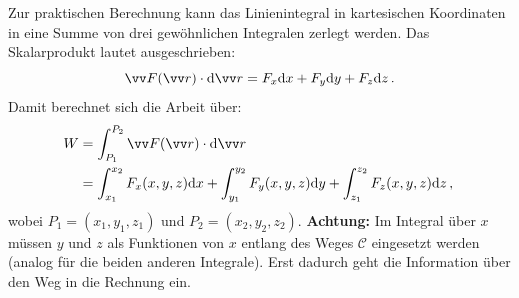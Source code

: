 Zur praktischen Berechnung kann das Linienintegral in kartesischen Koordinaten in eine Summe von drei gewöhnlichen Integralen zerlegt werden. Das Skalarprodukt lautet ausgeschrieben:
\begin{equation}
    \ivec{F}(\ivec{r}) \cdot \dd\ivec{r} = F_x \dd x + F_y \dd y + F_z \dd z \mDot
\end{equation}
Damit berechnet sich die Arbeit über:
\begin{equation}\label{eq: arbeit_integral_komponenten}\begin{aligned}
    W &= \int_{P_1}^{P_2} \ivec{F}(\ivec{r}) \cdot \dd \ivec{r} \\
    &= \int_{x_1}^{x_2} F_x(x,y,z) \dd x + \int_{y_1}^{y_2} F_y(x,y,z) \dd y + \int_{z_1}^{z_2} F_z(x,y,z) \dd z \mComma
\end{aligned}\end{equation}
wobei $P_1 = (x_1, y_1, z_1)$ und $P_2 = (x_2, y_2, z_2)$. \textbf{Achtung:} Im Integral über $x$ müssen $y$ und $z$ als Funktionen von $x$ entlang des Weges $\mathcal{C}$ eingesetzt werden (analog für die beiden anderen Integrale). Erst dadurch geht die Information über den Weg in die Rechnung ein. 

